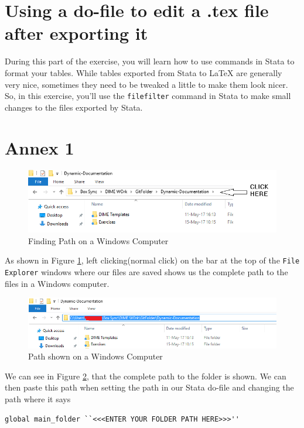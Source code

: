 \documentclass[]{article}
\begin{document}
\section*{Using a do-file to edit a .tex file after exporting it}
During this part of the exercise, you will learn how to use commands in Stata to format your tables. While tables exported from Stata to {\LaTeX} are generally very nice, sometimes they need to be tweaked a little to make them look nicer. So, in this exercise, you'll use the \texttt{filefilter} command in Stata to make small changes to the files exported by Stata. 

\newpage
\section*{Annex 1} {\label{annex1}}

\begin{figure}[H]
	\centering
	\includegraphics[width=1\linewidth]{img/pathwin}
	\caption{Finding Path on a Windows Computer}
	\label{fig:pathwin}
\end{figure}
As shown in Figure \ref{fig:pathwin}, left clicking(normal click) on the bar at the top of the \texttt{File Explorer} windows where our files are saved shows us the complete path to the files in a Windows computer. \\

\begin{figure}[H]
	\centering
	\includegraphics[width=1\linewidth]{img/pathwin2}
	\caption{Path shown on a Windows Computer}
	\label{fig:pathwin2}
\end{figure}

We can see in Figure \ref{fig:pathwin2}, that the complete path to the folder is shown. We can then paste this path when setting the path in our Stata do-file and changing the path where it says \begin{verbatim}
global main_folder ``<<<ENTER YOUR FOLDER PATH HERE>>>''
\end{verbatim} 
	
\end{document}
